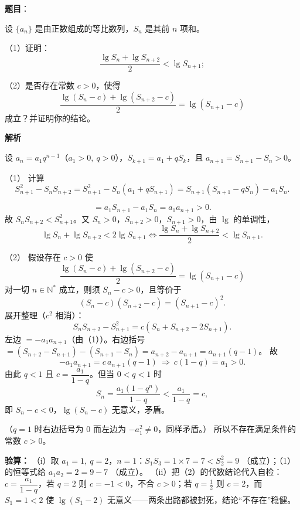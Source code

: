 \begin{answer}

\textbf{题目}：

设 $\{a_n\}$ 是由正数组成的等比数列，$S_n$ 是其前 $n$ 项和。

（1）证明：
\nopagebreak[4]
\[
\frac{\lg S_n+\lg S_{n+2}}{2}<\lg S_{n+1};
\]

（2）是否存在常数 $c>0$，使得
\nopagebreak[4]
\[
\frac{\lg(S_n-c)+\lg(S_{n+2}-c)}{2}=\lg(S_{n+1}-c)
\]
成立？并证明你的结论。

\textbf{解析}

设 $a_n=a_1q^{n-1}$（$a_1>0,\ q>0$），$S_{k+1}=a_1+qS_k$，且 $a_{n+1}=S_{n+1}-S_n>0$。

（1） 计算
\nopagebreak[4]
\[S_{n+1}^2-S_nS_{n+2}=S_{n+1}^2-S_n\left(a_1+qS_{n+1}\right)=S_{n+1}\left(S_{n+1}-qS_n\right)-a_1S_n.\]

\nopagebreak[4]
\[=a_1S_{n+1}-a_1S_n=a_1a_{n+1}>0.\]
故 $S_nS_{n+2}<S_{n+1}^2$。又 $S_n>0$，$S_{n+2}>0$，$S_{n+1}>0$，由 $\lg$ 的单调性，
\nopagebreak[4]
\[\lg S_n+\lg S_{n+2}<2\lg S_{n+1}\iff \frac{\lg S_n+\lg S_{n+2}}{2}<\lg S_{n+1}.\]

（2） 假设存在 $c>0$ 使
\nopagebreak[4]
\[\frac{\lg(S_n-c)+\lg(S_{n+2}-c)}{2}=\lg(S_{n+1}-c)\]
对一切 $n\in\mathbb N^*$ 成立，则须 $S_n-c>0$，且等价于
\nopagebreak[4]
\[(S_n-c)(S_{n+2}-c)=(S_{n+1}-c)^2.\]
展开整理（$c^2$ 相消）：
\nopagebreak[4]
\[S_nS_{n+2}-S_{n+1}^2=c\left(S_n+S_{n+2}-2S_{n+1}\right).\]
左边 $=-a_1a_{n+1}$（由（1））。右边括号 $=(S_{n+2}-S_{n+1})-(S_{n+1}-S_n)=a_{n+2}-a_{n+1}=a_{n+1}(q-1)$。
故
\nopagebreak[4]
\[-a_1a_{n+1}=c\,a_{n+1}(q-1)\ \Longrightarrow\ c(1-q)=a_1>0.\]
由此 $q<1$ 且 $c=\dfrac{a_1}{1-q}$。但当 $0<q<1$ 时
\nopagebreak[4]
\[S_n=\frac{a_1(1-q^n)}{1-q}<\frac{a_1}{1-q}=c,\]
即 $S_n-c<0$，$\lg(S_n-c)$ 无意义，矛盾。

（$q=1$ 时右边括号为 $0$ 而左边为 $-a_1^2\ne0$，同样矛盾。）
所以不存在满足条件的常数 $c>0$。

\textbf{验算：} （i）取 $a_1=1,\ q=2$，$n=1$：$S_1S_3=1\times7=7<S_2^2=9$ （成立）；（1）的恒等式给 $a_1a_2=2=9-7$ （成立）。
（ii）把（2）的代数结论代入自检：$c=\dfrac{a_1}{1-q}$，若 $q=2$ 则 $c=-1<0$，不合 $c>0$；若 $q=\frac12$ 则 $c=2$，而 $S_1=1<2$ 使 $\lg(S_1-2)$ 无意义——两条出路都被封死，结论“不存在”稳健。


\par\medskip

\end{answer}
